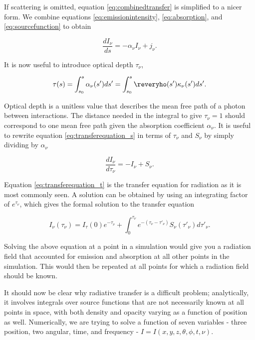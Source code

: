 If scattering is omitted, equation \ref{eq:combinedtransfer} is simplified to a nicer form. We combine equations \ref{eq:emissionintensity}, \ref{eq:absorption}, and \ref{eq:sourcefunction} to obtain

\begin{equation}
\label{eq:transferequation_s}
\frac{dI_{\nu}}{ds} = -\alpha_{\nu}I_{\nu} + j_{\nu}.
\end{equation}

It is now useful to introduce optical depth $\tau_{\nu}$,

\begin{equation}
\label{eq:opticaldepth}
\tau(s) = \int_{s_0}^{s} \alpha_{\nu}(s')ds' = \int_{s_0}^{s} \reveryho(s') \kappa_{\nu}(s') ds'.
\end{equation}

Optical depth is a unitless value that describes the mean free path of a photon between interactions. The distance needed in the integral to give $\tau_{\nu} = 1$ should correspond to one mean free path given the absorption coefficient $\alpha_{\nu}$. It is useful to rewrite equation \ref{eq:transferequation_s} in terms of $\tau_{\nu}$ and $S_{\nu}$ by simply dividing by $\alpha_{\nu}$

\begin{equation}
\label{eq:transferequation_t}
\frac{dI_{\nu}}{d\tau_{\nu}} = -I_{\nu} + S_{\nu}.
\end{equation}

Equation \ref{eq:transferequation_t} is the transfer equation for radiation as it is most commonly seen. A solution can be obtained by using an integrating factor of $e^{\tau_{\nu}}$, which gives the formal solution to the transfer equation

\begin{equation}
\label{eq:transferequationsolution}
I_{\nu}(\tau_{\nu}) = I_{\tau}(0)e^{-\tau_{\nu}} + \int_0^{\tau_{\nu}} e^{-(\tau_\nu - \tau'_{\nu})} S_{\nu}(\tau'_{\nu})d\tau'_{\nu}.
\end{equation}

Solving the above equation at a point in a simulation would give you a radiation field that accounted for emission and absorption at all other points in the simulation. This would then be repeated at all points for which a radiation field should be known.

It should now be clear why radiative transfer is a difficult problem; analytically, it involves integrals over source functions that are not necessarily known at all points in space, with both density and opacity varying as a function of position as well. Numerically, we are trying to solve a function of seven variables - three position, two angular, time, and frequency - $I = I(x,y,z,\theta,\phi,t,\nu)$.

